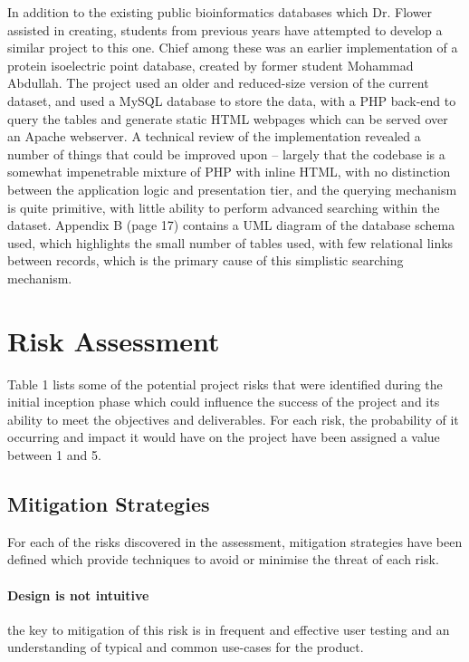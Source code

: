 \documentclass[12pt,a4paper]{article}
\begin{document}
In addition to the existing public bioinformatics databases which Dr. Flower
assisted in creating, students from previous years have attempted to develop a
similar project to this one. Chief among these was an earlier implementation of
a protein isoelectric point database, created by former student Mohammad
Abdullah. The project used an older and reduced-size version of the current
dataset, and used a MySQL database to store the data, with a PHP back-end to
query the tables and generate static HTML webpages which can be served over an
Apache webserver. A technical review of the implementation revealed a number of
things that could be improved upon – largely that the codebase is a somewhat
impenetrable mixture of PHP with inline HTML, with no distinction between the
application logic and presentation tier, and the querying mechanism is quite
primitive, with little ability to perform advanced searching within the
dataset. Appendix B (page 17) contains a UML diagram of the database schema
used, which highlights the small number of tables used, with few relational
links between records, which is the primary cause of this simplistic searching
mechanism.

\section{Risk Assessment}

Table 1 lists some of the potential project risks that were identified during
the initial inception phase which could influence the success of the project and
its ability to meet the objectives and deliverables. For each risk, the
probability of it occurring and impact it would have on the project have been
assigned a value between 1 and 5.

\subsection{Mitigation Strategies}

For each of the risks discovered in the assessment, mitigation strategies have
been defined which provide techniques to avoid or minimise the threat of each
risk.

\paragraph{Design is not intuitive} the key to mitigation of this risk is in frequent and
effective user testing and an understanding of typical and common use-cases for
the product.
\end{document}

